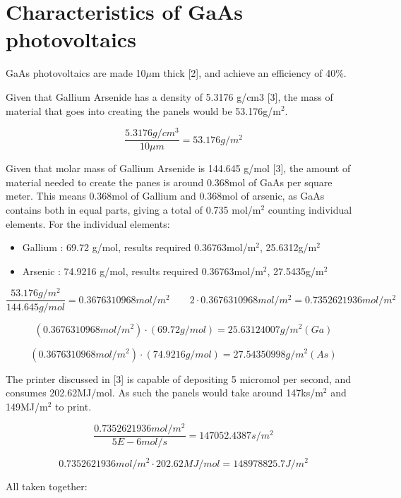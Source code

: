 \documentclass[a4paper]{article}
\begin{document}
	\pagebreak
	
	\section{Characteristics of GaAs photovoltaics}
	
	GaAs photovoltaics are made 10$\mu$m thick [2], and achieve an efficiency of 40\%.
	
	\bigskip
	
	Given that Gallium Arsenide has a density of 5.3176 g/cm3 [3], the mass of material that goes into creating the panels would be 53.176g/m$^2$.
	
	$$ \frac{5.3176g/cm^3}{10\mu m} = 53.176g/m^2 $$
	
	Given that molar mass of Gallium Arsenide is 144.645 g/mol [3], the amount of material needed to create the panes is around 0.368mol of GaAs per square meter.
	This means 0.368mol of Gallium and 0.368mol of arsenic, as GaAs contains both in equal parts, giving a total of 0.735 mol/m$^2$ counting individual elements.
	For the individual elements:
	
	\begin{itemize}
		\item Gallium : 69.72 g/mol, results required 0.36763mol/m$^2$, 25.6312g/m$^2$
		
		\item Arsenic : 74.9216 g/mol, results required 0.36763mol/m$^2$, 27.5435g/m$^2$
	\end{itemize}
	
	
	$$ \frac{53.176g/m^2}{144.645 g/mol} = 0.3676310968 mol/m^2 \qquad 2 \cdot 0.3676310968 mol/m^2 = 0.7352621936 mol/m^2 $$
	
	$$ (0.3676310968 mol/m^2) \cdot (69.72 g/mol) = 25.63124007 g/m^2 (Ga) $$
	
	$$ (0.3676310968 mol/m^2) \cdot (74.9216 g/mol) = 27.54350998 g/m^2 (As) $$
	
	\bigskip
	
	The printer discussed in [3] is capable of depositing 5 micromol per second, and consumes 202.62MJ/mol.
	As such the panels would take around 147ks/m$^2$ and 149MJ/m$^2$ to print.
	
	$$ \frac{0.7352621936 mol/m^2}{5E-6 mol/s} = 147052.4387 s/m^2 $$
	
	$$ 0.7352621936 mol/m^2 \cdot 202.62MJ/mol = 148978825.7 J/m^2 $$
	
	\bigskip
	
	All taken together:
	
\end{document}
